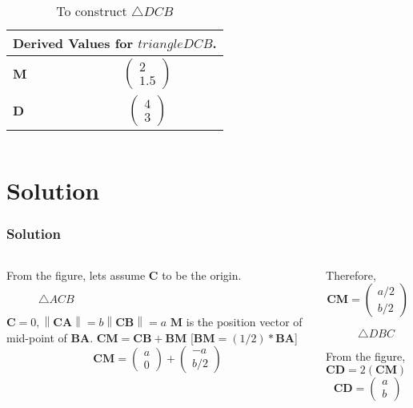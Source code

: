 \documentclass{beamer}
\newcommand\norm[1]{\left\lVert#1\right\rVert}
\renewcommand{\vec}[1]{\mathbf{#1}}
\begin{document}
\begin{frame}[fragile]
\begin{columns}
\begin{column}{0.5\textwidth}
\begin{table}[H]
{\begin{minipage}{\textwidth}
\begin{tabular}{ |p{3cm}|p{3cm}|  }
\hline
 \multicolumn{2}{|c|}{Derived Values for $triangle DCB$.} \\
\hline
$\vec{M}$ & $$\begin{pmatrix}2\\1.5\end{pmatrix}$$\\				
\hline
$\vec{D}$ & $$\begin{pmatrix}4\\3\end{pmatrix} $$\\
\hline
\end{tabular}
\end{minipage}}
\caption{\tiny To construct $\triangle DCB$}
\end{table}
\end{column}
\end{columns}
\end{frame}
\section*{\textbf{Solution}}
\begin{frame}[fragile]
\footnotesize
\frametitle{Solution}
\begin{columns}
\begin{column}{0.5\textwidth}
From the figure, lets assume $\vec{C}$ to be the origin.
\newline
\begin{figure}[H]
%
\caption{$\triangle ACB$}
\end{figure}
$\vec{C}=0, 
\norm{\vec{CA}}=b 
\norm{\vec{CB}}=a$
\newline
$\vec{M}$ is the position vector of mid-point of $\vec{BA}$.
\newline
$\vec{CM} = \vec{CB}+\vec{BM}$ [$\vec{BM}=(1/2)*\vec{BA}$]
\newline
$$\vec{CM} =\begin{pmatrix}a\\0\end{pmatrix}+\begin{pmatrix}-a\\b/2\end{pmatrix}$$
\end{column}
\begin{column}{0.5\textwidth}
Therefore, $$\vec{CM}=\begin{pmatrix}a/2\\b/2\end{pmatrix}$$
\begin{figure}[H]
%
\caption{$\triangle DBC$}
\end{figure}
From the figure, $\vec{CD}=2(\vec{CM})$
\newline
$$\vec{CD}=\begin{pmatrix}a\\b\end{pmatrix}$$
\end{column}
\end{columns}
\end{frame}
\end{document}
